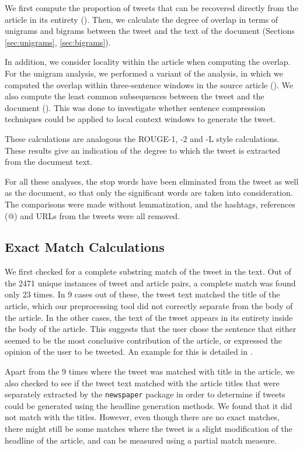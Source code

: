 We first compute the proportion of tweets that can be recovered directly from the article in its entirety (). Then, we calculate the degree of overlap in terms of unigrams and bigrams between the tweet and the text of the document (Sections \ref{sec:unigrams}, \ref{sec:bigrams}). 

In addition, we consider locality within the article when computing the overlap. For the unigram analysis, we performed a variant of the analysis, in which we computed the overlap within three-sentence windows in the source article (). We also compute the least common subsequences between the tweet and the document (). This was done to investigate whether sentence compression techniques could be applied to local context windows to generate the tweet.

These calculations are analogous the ROUGE-1, -2 and -L style calculations. These results give an indication of the degree to which the tweet is extracted from the document text. 

For all these analyses, the stop words have been eliminated from the tweet as well as the document, so that only the significant words are taken into consideration. The comparisons were made without lemmatization, and the hashtags, references (@) and URLs from the tweets were all removed. 

\subsection {Exact Match Calculations}
\label{sec:exact-match}
We first checked for a complete substring match of the tweet in the text. Out of the 2471 unique instances of tweet and article pairs, a complete match was found only 23 times. In 9 cases out of these, the tweet text matched the title of the article, which our preprocessing tool did not correctly separate from the body of the article. In the other cases, the text of the tweet appears in its entirety inside the body of the article. This suggests that the user chose the sentence that either seemed to be the most conclusive contribution of the article, or expressed the opinion of the user to be tweeted. An example for this is detailed in .

Apart from the 9 times where the tweet was matched with title in the article, we also checked to see if the tweet text matched with the article titles that were separately extracted by the \texttt{newspaper} package in order to determine if tweets could be generated using the headline generation methods. We found that it did not match with the titles. However, even though there are no exact matches, there might still be some matches where the tweet is a slight modification of the headline of the article, and can be measured using a partial match measure.

